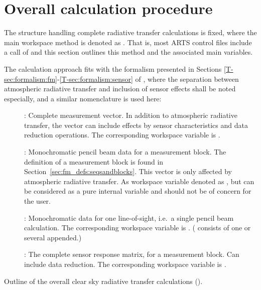 \section{Overall calculation procedure}
\label{sec:fm_defs:calcproc}

The structure handling complete radiative transfer calculations is
fixed, where the main workspace method is denoted as . That is,
most ARTS control files include a call of  and this section
outlines this method and the associated main variables.

The calculation approach fits with the formalism presented in Sections
\ref{T-sec:formalism:fm}-\ref{T-sec:formalism:sensor} of \theory, where the
separation between atmospheric radiative transfer and inclusion of sensor
effects shall be noted especially, and a similar nomenclature is used here:
\begin{description}
\item[\MsrVct]: Complete measurement vector. In addition to atmospheric
  radiative transfer, the vector can include effects by sensor characteristics
  and data reduction operations. The corresponding workspace variable is 
  .
\item[]: Monochromatic pencil beam data for a measurement block. The
  definition of a measurement block is found in
  Section~\ref{sec:fm_defs:seqsandblocks}. This vector is only affected by
  atmospheric radiative transfer. As workspace variable denoted as
  , but can be considered as a pure internal variable and should
  not be of concern for the user.
\item[]: Monochromatic data for one line-of-sight, i.e.\ a single
  pencil beam calculation. The corresponding workspace variable is
  . ( consists of one or several  appended.)
\item[]: The complete sensor response matrix, for a measurement
  block. Can include data reduction. The corresponding workspace variable is
  .
\end{description}
\begin{algorithm}[t]
 \begin{algorithmic}
   \ENDFOR
  \ENDFOR
 \end{algorithmic}
 \caption{Outline of the overall clear sky radiative transfer calculations
   ().}
 \label{alg:fm_defs:yCalc}
\end{algorithm}
